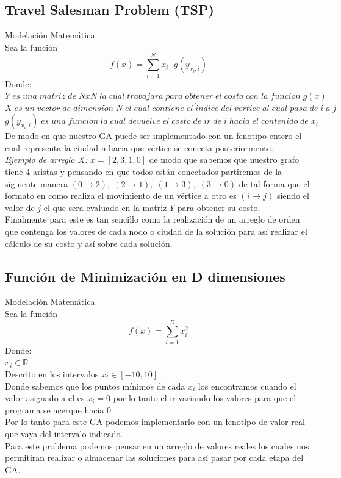 \documentclass[10pt]{article}
\begin{document}
\subsection{Travel Salesman Problem (TSP)}
Modelación Matemática\\
Sea la función
\[f(x)=\sum_{i=1}^{N}x_{i} \cdot g\left(y_{x_{i},i}\right)\]
Donde:\\
\(\displaystyle Y\;es\;una\;matriz\;de\;NxN\;la\;cual\;trabajara\;para\;obtener\;el\;costo\;con\;la\;funci\acute{o}n\;g(x)\)\\\vspace{0.25cm}
\(\displaystyle X\;es\;un\;vector\;de\;dimensi\acute{o}n\;N\;el\;cual\;contiene\;el\;\acute{i}ndice\;del\;v\acute{e}rtice\;al\;cual\;pasa\;de\;i\;a\;j\)\\\vspace{0.25cm}
\(\displaystyle g(y_{x_{i},i})\;es\;una\;funci\acute{o}n\;la\;cual\;devuelve\;el\;costo\;de\;ir\;de\;i\;hacia\;el\;contenido\;de\;x_{i}\)\\\vspace{0.25cm}
De modo en que nuestro GA puede ser implementado con un fenotipo entero el cual representa la ciudad n hacia que vértice se conecta posteriormente.\\\vspace{0.25cm}
\textit{Ejemplo de arreglo $X$: }\(\displaystyle x=[2,3,1,0]\) de modo que sabemos que nuestro grafo tiene $4$ aristas y pensando en que todos están conectados partiremos de la siguiente manera $(0\rightarrow 2),\;(2\rightarrow 1),\;(1\rightarrow 3),\;(3\rightarrow 0)$ de tal forma que el formato en como realiza el movimiento de un vértice a otro es $(i\rightarrow j)$ siendo el valor de $j$ el que sera evaluado en la matriz $Y$ para obtener su costo.\\
Finalmente para este es tan sencillo como la realización de un arreglo de orden que contenga los valores de cada nodo o ciudad de la solución para así realizar el cálculo de su costo y así sobre cada solución.
\subsection{Función de Minimización en D dimensiones}
Modelación Matemática\\
Sea la función
\[f(x)=\sum_{i=1}^{D}x_{i}^{2}\]
Donde:\\
\(\displaystyle x_{i}\in\mathbb{R}\)\\\vspace{0.25cm}Descrito en los intervalos \(\displaystyle x_{i}\in[-10,10]\)\\\vspace{0.25cm}
Donde sabemos que los puntos mínimos de cada $x_{i}$ los encontramos cuando el valor asignado a el es $x_{i}=0$ por lo tanto el ir variando los valores para que el programa se acerque hacia $0$\\\vspace{0.25cm}
Por lo tanto para este GA podemos implementarlo con un fenotipo de valor real que vaya del intervalo indicado.\\
Para este problema podemos pensar en un arreglo de valores reales los cuales nos permitiran realizar o almacenar las soluciones para así pasar por cada etapa del GA.
\end{document}

